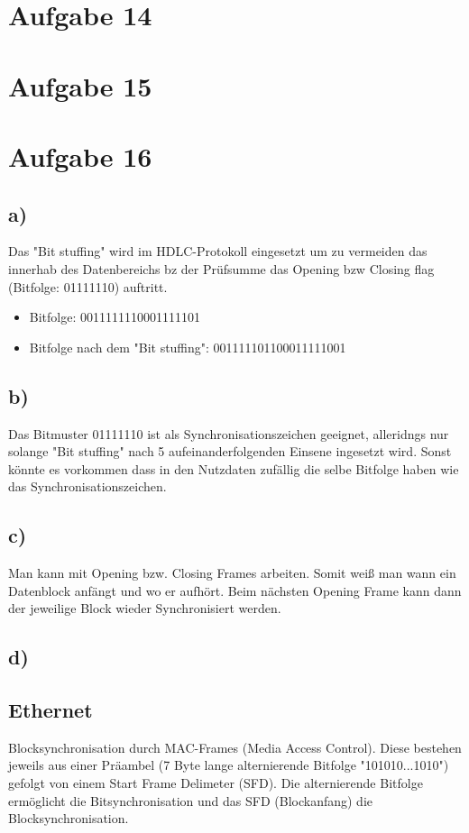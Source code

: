 \documentclass[a4paper,12pt]{scrartcl}
\begin{document}
\section{Aufgabe 14}
\section{Aufgabe 15}
\section{Aufgabe 16}
\subsection{a)}
Das "Bit stuffing" wird im HDLC-Protokoll eingesetzt um zu vermeiden das innerhab des Datenbereichs bz der Prüfsumme das Opening bzw Closing flag (Bitfolge: 01111110) auftritt.
\begin{itemize}
	\item Bitfolge: 0011111110001111101
	\item Bitfolge nach dem "Bit stuffing": 001111101100011111001
\end{itemize}
\subsection{b)}
Das Bitmuster 01111110 ist als Synchronisationszeichen geeignet, alleridngs nur solange "Bit stuffing" nach 5 aufeinanderfolgenden Einsene ingesetzt wird. Sonst könnte es vorkommen dass in den Nutzdaten zufällig die selbe Bitfolge haben wie das Synchronisationszeichen.
\subsection{c)}
Man kann mit Opening bzw. Closing Frames arbeiten. Somit weiß man wann ein Datenblock anfängt und wo er aufhört. Beim nächsten Opening Frame kann dann der jeweilige Block wieder Synchronisiert werden.
\subsection{d)}
\subsection{Ethernet}
Blocksynchronisation durch MAC-Frames (Media Access Control). Diese bestehen jeweils aus einer Präambel (7 Byte lange alternierende Bitfolge "101010...1010") gefolgt von einem Start Frame Delimeter (SFD). Die alternierende Bitfolge ermöglicht die Bitsynchronisation und das SFD (Blockanfang) die Blocksynchronisation.
\end{document}
